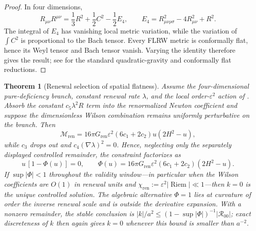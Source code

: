 \documentclass[11pt]{article}
\newtheorem{theorem}{Theorem}[section]
\theoremstyle{definition}
\theoremstyle{remark}
\newcommand{\eps}{\varepsilon}
\newcommand{\ren}{\mathrm{ren}}
\newcommand{\Mren}{\mathcal M_{\mathrm{ren}}}
\newcommand{\Riem}{\operatorname{Riem}}
\newcommand{\Gren}{G_{\mathrm{ren}}}
\begin{document}
\begin{proof}
In four dimensions,
\[
 R_{\mu\nu}R^{\mu\nu}=\frac13R^2+\frac12C^2-\frac12E_4,
 \qquad
 E_4=R_{\mu\nu\rho\sigma}^2-4R_{\mu\nu}^2+R^2.
\]
The integral of $E_4$ has vanishing local metric variation, while the variation
of $\int C^2$ is proportional to the Bach tensor.  Every FLRW metric is
conformally flat, hence its Weyl tensor and Bach tensor vanish.  Varying the
identity therefore gives the result; see
\cite{Stelle1977,Besse,Starobinsky1980} for the standard quadratic-gravity and
conformally flat reductions.
\end{proof}

\begin{theorem}[Renewal selection of spatial flatness]
\label{thm:renewal-flatness}
Assume the four-dimensional pure-deficiency branch, constant renewal rate
$\lambda$, and the local order-$\eps^2$ action of
.  Absorb the constant $c_5\lambda^2R$ term into
the renormalized Newton coefficient and suppose the dimensionless Wilson
combination remains uniformly perturbative on the branch.  Then
\begin{equation}
\label{eq:curvature-locked-memory}
 \Mren=16\pi\Gren\eps^2(6c_1+2c_2)
 u(2H^2-u),
\end{equation}
while $c_3$ drops out and $c_4(\nabla\lambda)^2=0$.  Hence, neglecting only
the separately displayed controlled remainder, the constraint factorizes as
\begin{equation}
\label{eq:renewal-flatness-factorization}
 u\,[1-\Phi(u)]=0,
 \qquad
 \Phi(u)=16\pi\Gren\eps^2(6c_1+2c_2)(2H^2-u).
\end{equation}
If $\sup|\Phi|<1$ throughout the validity window---in particular when the
Wilson coefficients are $O(1)$ in renewal units and
$\chi_{\ren}:=\eps^2|\Riem|\ll1$---then $k=0$ is the unique controlled
solution.  The algebraic alternative $\Phi=1$ lies at curvature of order the
inverse renewal scale and is outside the derivative expansion.  With a nonzero
remainder, the stable conclusion is
$|k|/a^2\le(1-\sup|\Phi|)^{-1}|\mathcal R_{00}|$; exact discreteness of
$k$ then again gives $k=0$ whenever this bound is smaller than $a^{-2}$.
\end{theorem}
\end{document}
